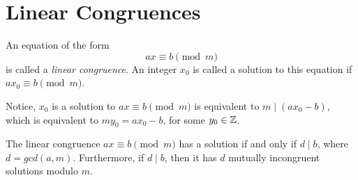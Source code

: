 \section{Linear Congruences}
\begin{definition}
    An equation of the form 
    \[ax \equiv b \pmod{m}\]
    is called a \textit{linear congruence}. An integer $x_0$ is called a solution to this equation if $ax_0 \equiv b \pmod{m}$.
\end{definition}
Notice, $x_0$ is a solution to $ax \equiv b \pmod{m}$ is equivalent to $m \mid (ax_0 - b)$, which is equivalent to $my_0 = ax_0 - b$, for some $y_0 \in \mathbb{Z}$.
\begin{theorem}
    The linear congruence $ax \equiv b \pmod{m}$ has a solution if and only if $d \mid b$, where $d = gcd(a, m)$. Furthermore, if $d \mid b$, then it has $d$ mutually incongruent solutions modulo $m$.
\end{theorem}
